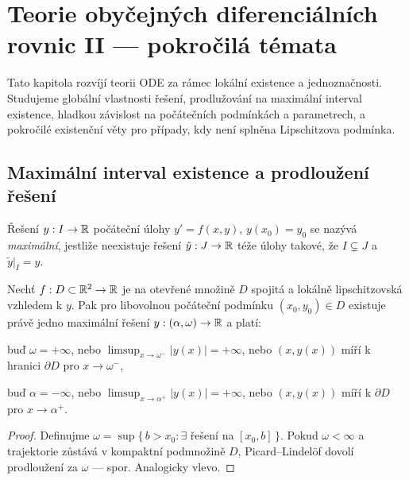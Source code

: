 \section{Teorie obyčejných diferenciálních rovnic II — pokročilá témata}
\label{sec:ODE-pokrocila-temata}

Tato kapitola rozvíjí teorii ODE za rámec lokální existence a jednoznačnosti. 
Studujeme globální vlastnosti řešení, prodlužování na maximální interval existence, hladkou závislost na počátečních podmínkách a parametrech, 
a pokročilé existenční věty pro případy, kdy není splněna Lipschitzova podmínka.

\spc

\subsection{Maximální interval existence a prodloužení řešení}
\label{sec:maximalni-interval}

\begin{definition}
\label{def:maximalni-reseni}
Řešení $y:I\to\mathbb{R}$ počáteční úlohy $y'=f(x,y)$, $y(x_0)=y_0$ se nazývá \emph{maximální}, jestliže neexistuje řešení $\tilde y:J\to\mathbb{R}$ téže úlohy takové, že $I\subsetneq J$ a $\tilde y|_I=y$.
\end{definition}

\begin{theorem}
\label{vet:prodlouzeni}
Nechť $f:D\subset\mathbb{R}^2\to\mathbb{R}$ je na otevřené množině $D$ spojitá a lokálně lipschitzovská vzhledem k $y$. 
Pak pro libovolnou počáteční podmínku $(x_0,y_0)\in D$ existuje právě jedno maximální řešení $y:(\alpha,\omega)\to\mathbb{R}$ a platí:
\begin{romanenum}
\item buď $\omega=+\infty$, nebo $\limsup_{x\to\omega^-}|y(x)|=+\infty$, nebo $(x,y(x))$ míří k hranici $\partial D$ pro $x\to\omega^-$,
\item buď $\alpha=-\infty$, nebo $\limsup_{x\to\alpha^+}|y(x)|=+\infty$, nebo $(x,y(x))$ míří k $\partial D$ pro $x\to\alpha^+$.
\end{romanenum}
\end{theorem}

\begin{proof}
Definujme $\omega=\sup\{\,b>x_0:\exists$ řešení na $[x_0,b]\,\}$. 
Pokud $\omega<\infty$ a trajektorie zůstává v kompaktní podmnožině $D$, Picard–Lindel\"of dovolí prodloužení za $\omega$ — spor. Analogicky vlevo.
\end{proof}

